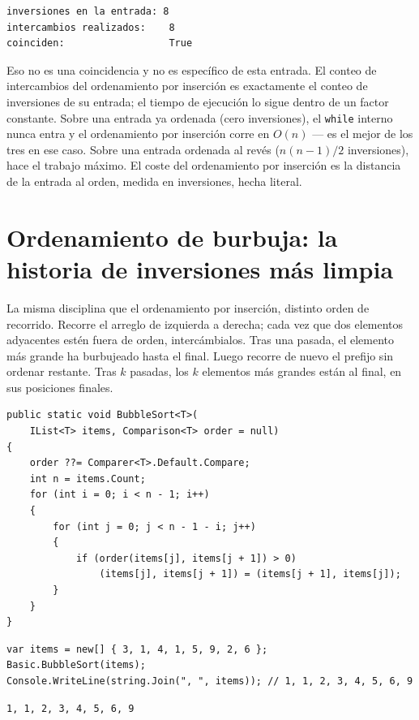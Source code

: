 \documentclass[11pt,a4paper]{article}
\begin{document}
\begin{verbatim}
inversiones en la entrada: 8
intercambios realizados:    8
coinciden:                  True
\end{verbatim}

Eso no es una coincidencia y no es específico de esta entrada. El conteo de intercambios del ordenamiento por inserción es exactamente el conteo de inversiones de su entrada; el tiempo de ejecución lo sigue dentro de un factor constante. Sobre una entrada ya ordenada (cero inversiones), el \texttt{while} interno nunca entra y el ordenamiento por inserción corre en $O(n)$ --- es el mejor de los tres en ese caso. Sobre una entrada ordenada al revés ($n(n-1)/2$ inversiones), hace el trabajo máximo. El coste del ordenamiento por inserción es la distancia de la entrada al orden, medida en inversiones, hecha literal.

\section{Ordenamiento de burbuja: la historia de inversiones más limpia}

La misma disciplina que el ordenamiento por inserción, distinto orden de recorrido. Recorre el arreglo de izquierda a derecha; cada vez que dos elementos adyacentes estén fuera de orden, intercámbialos. Tras una pasada, el elemento más grande ha burbujeado hasta el final. Luego recorre de nuevo el prefijo sin ordenar restante. Tras $k$ pasadas, los $k$ elementos más grandes están al final, en sus posiciones finales.

\begin{lstlisting}[caption={Ordenamiento de burbuja}]
public static void BubbleSort<T>(
    IList<T> items, Comparison<T> order = null)
{
    order ??= Comparer<T>.Default.Compare;
    int n = items.Count;
    for (int i = 0; i < n - 1; i++)
    {
        for (int j = 0; j < n - 1 - i; j++)
        {
            if (order(items[j], items[j + 1]) > 0)
                (items[j], items[j + 1]) = (items[j + 1], items[j]);
        }
    }
}
\end{lstlisting}

\begin{lstlisting}
var items = new[] { 3, 1, 4, 1, 5, 9, 2, 6 };
Basic.BubbleSort(items);
Console.WriteLine(string.Join(", ", items)); // 1, 1, 2, 3, 4, 5, 6, 9
\end{lstlisting}

\begin{verbatim}
1, 1, 2, 3, 4, 5, 6, 9
\end{verbatim}
\end{document}

